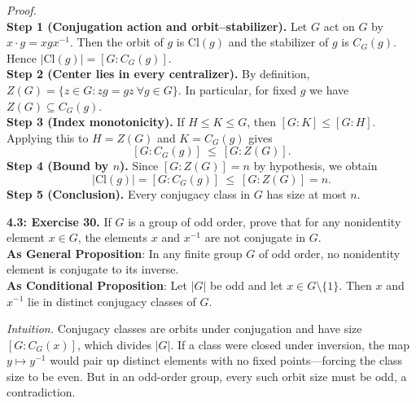 \documentclass[11pt]{article}
\theoremstyle{definition}
\newcommand{\Cl}{\mathrm{Cl}}
\begin{document}
\emph{Proof.}\\
\textbf{Step 1 (Conjugation action and orbit–stabilizer).} Let $G$ act on $G$ by $x\cdot g=xgx^{-1}$. Then the orbit of $g$ is $\Cl(g)$ and the stabilizer of $g$ is $C_G(g)$. Hence $|\Cl(g)|=[G:C_G(g)]$.\\
\textbf{Step 2 (Center lies in every centralizer).} By definition, $Z(G)=\{z\in G: zg=gz\ \forall g\in G\}$. In particular, for fixed $g$ we have $Z(G)\subseteq C_G(g)$.\\
\textbf{Step 3 (Index monotonicity).} If $H\le K\le G$, then $[G:K]\le [G:H]$. Applying this to $H=Z(G)$ and $K=C_G(g)$ gives
\[
[G:C_G(g)]\ \le\ [G:Z(G)].
\]
\textbf{Step 4 (Bound by $n$).} Since $[G:Z(G)]=n$ by hypothesis, we obtain
\[
|\Cl(g)|=[G:C_G(g)]\ \le\ [G:Z(G)]=n.
\]
\textbf{Step 5 (Conclusion).} Every conjugacy class in $G$ has size at most $n$.\\

\newpage

\newpage

\noindent \textbf{4.3: Exercise 30.} If $G$ is a group of odd order, prove that for any nonidentity element $x\in G$, the elements $x$ and $x^{-1}$ are not conjugate in $G$.\\ %

\noindent\textbf{As General Proposition}: In any finite group $G$ of odd order, no nonidentity element is conjugate to its inverse.\\

\noindent\textbf{As Conditional Proposition}: Let $|G|$ be odd and let $x\in G\setminus\{1\}$. Then $x$ and $x^{-1}$ lie in distinct conjugacy classes of $G$.\\

\newpage

\dotfill

\emph{Intuition.} Conjugacy classes are orbits under conjugation and have size $[G:C_G(x)]$, which divides $|G|$. If a class were closed under inversion, the map $y\mapsto y^{-1}$ would pair up distinct elements with no fixed points—forcing the class size to be even. But in an odd-order group, every such orbit size must be odd, a contradiction.\\

\dotfill
\end{document}

